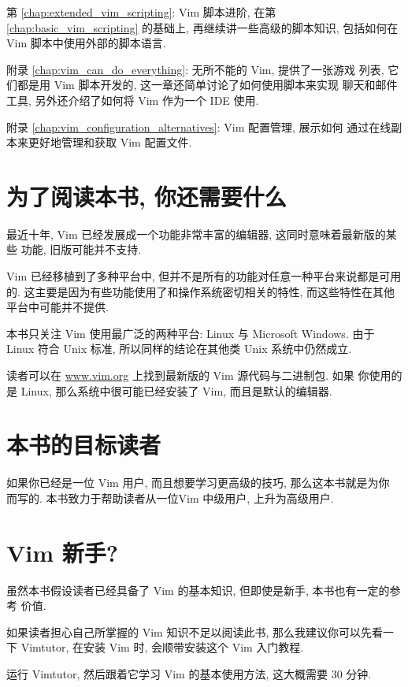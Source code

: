 第 \ref{chap:extended_vim_scripting}: Vim 脚本进阶, 在第
\ref{chap:basic_vim_scripting} 的基础上, 再继续讲一些高级的脚本知识,
包括如何在 Vim 脚本中使用外部的脚本语言.

附录 \ref{chap:vim_can_do_everything}: 无所不能的 Vim, 提供了一张游戏
列表, 它们都是用 Vim 脚本开发的, 这一章还简单讨论了如何使用脚本来实现
聊天和邮件工具, 另外还介绍了如何将 Vim 作为一个 IDE 使用.

附录 \ref{chap:vim_configuration_alternatives}: Vim 配置管理, 展示如何
通过在线副本来更好地管理和获取 Vim 配置文件.

\section*{为了阅读本书, 你还需要什么}
最近十年, Vim 已经发展成一个功能非常丰富的编辑器, 这同时意味着最新版的某些
功能, 旧版可能并不支持.

Vim 已经移植到了多种平台中, 但并不是所有的功能对任意一种平台来说都是可用
的. 这主要是因为有些功能使用了和操作系统密切相关的特性, 而这些特性在其他
平台中可能并不提供.

本书只关注 Vim 使用最广泛的两种平台: Linux 与 Microsoft Windows. 由于 Linux 
符合 Unix 标准, 所以同样的结论在其他类 Unix 系统中仍然成立.

\begin{warning}
读者可以在 \url{www.vim.org} 上找到最新版的 Vim 源代码与二进制包. 如果 
你使用的是 Linux, 那么系统中很可能已经安装了 Vim, 而且是默认的编辑器.
\end{warning}

\section*{本书的目标读者}
\label{sec:who_this_book_is_for}
如果你已经是一位 Vim 用户, 而且想要学习更高级的技巧, 那么这本书就是为你
而写的. 本书致力于帮助读者从一位Vim 中级用户, 上升为高级用户.

\section*{Vim 新手?}
\label{sec:new_to_vim}
虽然本书假设读者已经具备了 Vim 的基本知识, 但即使是新手, 本书也有一定的参考
价值.

如果读者担心自己所掌握的 Vim  知识不足以阅读此书, 那么我建议你可以先看一下
Vimtutor, 在安装 Vim 时, 会顺带安装这个 Vim 入门教程.

运行 Vimtutor, 然后跟着它学习 Vim 的基本使用方法, 这大概需要 30 分钟.

